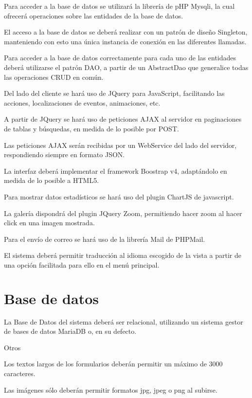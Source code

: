Para acceder a la base de datos se utilizar\'{a} la librer\'{i}a de pHP Mysqli, la cual ofrecer\'{a} operaciones sobre las entidades de la base de datos.

El acceso a la base de datos se deber\'{a} realizar con un patr\'{o}n de dise\~{n}o Singleton, manteniendo con esto una \'{u}nica instancia de conexi\'{o}n en las diferentes llamadas.

Para acceder a la base de datos correctamente para cada uno de las entidades deber\'{a} utilizarse el patr\'{o}n DAO, a partir de un AbstractDao que generalice todas las operaciones CRUD en com\'{u}n.

Del lado del cliente se har\'{a} uso de JQuery para JavaScript, facilitando las acciones, localizaciones de eventos, animaciones, etc.

A partir de JQuery se har\'{a} uso de peticiones AJAX al servidor en paginaciones de tablas y b\'{u}squedas, en medida de lo posible por POST.

Las peticiones AJAX ser\'{a}n recibidas por un WebService del lado del servidor, respondiendo siempre en formato JSON.

La interfaz deber\'{a} implementar el framework Boostrap v4, adapt\'{a}ndolo en medida de lo posible a HTML5.

Para mostrar datos estad\'{i}sticos se har\'{a} uso del plugin ChartJS de javascript.

La galer\'{i}a dispondr\'{a} del plugin JQuery Zoom, permitiendo hacer zoom al hacer click en una imagen mostrada.

Para el env\'{i}o de correo se har\'{a} uso de la librer\'{i}a Mail de PHPMail.

El sistema deber\'{a} permitir traducci\'{o}n al idioma escogido de la vista a partir de una opci\'{o}n facilitada para ello en el men\'{u} principal.


\section{Base de datos}

La Base de Datos del sistema deber\'{a} ser relacional, utilizando un sistema gestor de bases de datos MariaDB o, en su defecto.


Otros

Los textos largos de los formularios deber\'{a}n permitir un m\'{a}ximo de 3000 caracteres.

Las im\'{a}genes s\'{o}lo deber\'{a}n permitir formatos jpg, jpeg o png al subirse.

